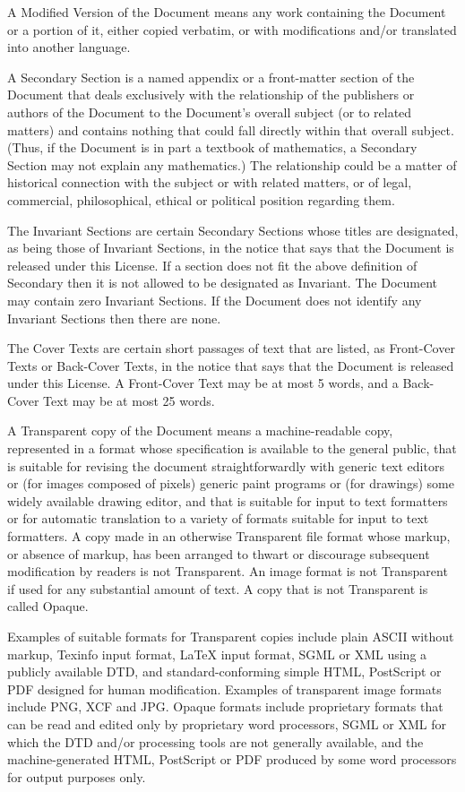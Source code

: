\documentclass[captions=tableheading]{scrbook}
\begin{document}
A Modified Version of the Document means any work containing the Document or a portion of it, either copied verbatim, or with modifications and/or translated into another language.

A Secondary Section is a named appendix or a front-matter section of the Document that deals exclusively with the relationship of the publishers or authors of the Document to the Document's overall subject (or to related matters) and contains nothing that could fall directly within that overall subject. (Thus, if the Document is in part a textbook of mathematics, a Secondary Section may not explain any mathematics.) The relationship could be a matter of historical connection with the subject or with related matters, or of legal, commercial, philosophical, ethical or political position regarding them.

The Invariant Sections are certain Secondary Sections whose titles are designated, as being those of Invariant Sections, in the notice that says that the Document is released under this License. If a section does not fit the above definition of Secondary then it is not allowed to be designated as Invariant. The Document may contain zero Invariant Sections. If the Document does not identify any Invariant Sections then there are none.

The Cover Texts are certain short passages of text that are listed, as Front-Cover Texts or Back-Cover Texts, in the notice that says that the Document is released under this License. A Front-Cover Text may be at most 5 words, and a Back-Cover Text may be at most 25 words.

A Transparent copy of the Document means a machine-readable copy, represented in a format whose specification is available to the general public, that is suitable for revising the document straightforwardly with generic text editors or (for images composed of pixels) generic paint programs or (for drawings) some widely available drawing editor, and that is suitable for input to text formatters or for automatic translation to a variety of formats suitable for input to text formatters. A copy made in an otherwise Transparent file format whose markup, or absence of markup, has been arranged to thwart or discourage subsequent modification by readers is not Transparent. An image format is not Transparent if used for any substantial amount of text. A copy that is not Transparent is called Opaque.

Examples of suitable formats for Transparent copies include plain ASCII without markup, Texinfo input format, \LaTeX{} input format, SGML or XML using a publicly available DTD, and standard-conforming simple HTML, PostScript or PDF designed for human modification. Examples of transparent image formats include PNG, XCF and JPG. Opaque formats include proprietary formats that can be read and edited only by proprietary word processors, SGML or XML for which the DTD and/or processing tools are not generally available, and the machine-generated HTML, PostScript or PDF produced by some word processors for output purposes only.
\end{document}
